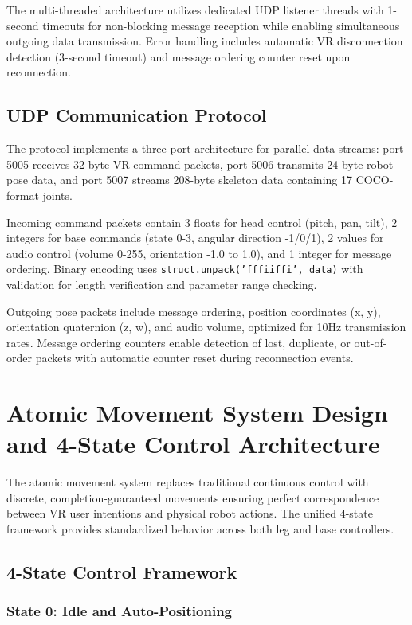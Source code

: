 The multi-threaded architecture utilizes dedicated UDP listener threads with 1-second timeouts for non-blocking message reception while enabling simultaneous outgoing data transmission. Error handling includes automatic VR disconnection detection (3-second timeout) and message ordering counter reset upon reconnection.

\subsection{UDP Communication Protocol}

The protocol implements a three-port architecture for parallel data streams: port 5005 receives 32-byte VR command packets, port 5006 transmits 24-byte robot pose data, and port 5007 streams 208-byte skeleton data containing 17 COCO-format joints.

Incoming command packets contain 3 floats for head control (pitch, pan, tilt), 2 integers for base commands (state 0-3, angular direction -1/0/1), 2 values for audio control (volume 0-255, orientation -1.0 to 1.0), and 1 integer for message ordering. Binary encoding uses \texttt{struct.unpack('fffiiffi', data)} with validation for length verification and parameter range checking.

Outgoing pose packets include message ordering, position coordinates (x, y), orientation quaternion (z, w), and audio volume, optimized for 10Hz transmission rates. Message ordering counters enable detection of lost, duplicate, or out-of-order packets with automatic counter reset during reconnection events.

\section{Atomic Movement System Design and 4-State Control Architecture}

The atomic movement system replaces traditional continuous control with discrete, completion-guaranteed movements ensuring perfect correspondence between VR user intentions and physical robot actions. The unified 4-state framework provides standardized behavior across both leg and base controllers.

\subsection{4-State Control Framework}

\subsubsection{State 0: Idle and Auto-Positioning}

